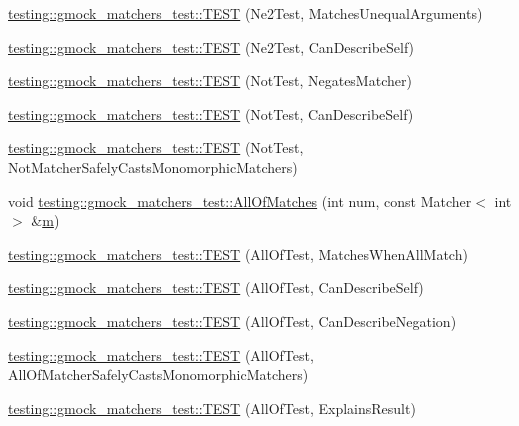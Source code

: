 \begin{DoxyCompactItemize}
\hyperlink{namespacetesting_1_1gmock__matchers__test_a69692057d2825f6fc8a37265667867c7}{testing\+::gmock\+\_\+matchers\+\_\+test\+::\+T\+E\+ST} (Ne2\+Test, Matches\+Unequal\+Arguments)
\item 
\hyperlink{namespacetesting_1_1gmock__matchers__test_acedf2eda13385067ee70bdb7d6073427}{testing\+::gmock\+\_\+matchers\+\_\+test\+::\+T\+E\+ST} (Ne2\+Test, Can\+Describe\+Self)
\item 
\hyperlink{namespacetesting_1_1gmock__matchers__test_ab41b57eeaea5568064b6ed3725316c73}{testing\+::gmock\+\_\+matchers\+\_\+test\+::\+T\+E\+ST} (Not\+Test, Negates\+Matcher)
\item 
\hyperlink{namespacetesting_1_1gmock__matchers__test_a831db2bf90c3950953cdceaefebddd40}{testing\+::gmock\+\_\+matchers\+\_\+test\+::\+T\+E\+ST} (Not\+Test, Can\+Describe\+Self)
\item 
\hyperlink{namespacetesting_1_1gmock__matchers__test_a46849e0c019e331f830ed91137fa417a}{testing\+::gmock\+\_\+matchers\+\_\+test\+::\+T\+E\+ST} (Not\+Test, Not\+Matcher\+Safely\+Casts\+Monomorphic\+Matchers)
\item 
void \hyperlink{namespacetesting_1_1gmock__matchers__test_a51d8731c3824a6acdaa594645dd46779}{testing\+::gmock\+\_\+matchers\+\_\+test\+::\+All\+Of\+Matches} (int num, const Matcher$<$ int $>$ \&\hyperlink{variables__e_8js_aab4247b6acebcba996939b177f483c14}{m})
\item 
\hyperlink{namespacetesting_1_1gmock__matchers__test_a7714d041eb2dd2e233db7f175fedef5a}{testing\+::gmock\+\_\+matchers\+\_\+test\+::\+T\+E\+ST} (All\+Of\+Test, Matches\+When\+All\+Match)
\item 
\hyperlink{namespacetesting_1_1gmock__matchers__test_a31056975d89eea2786997cf18b086bf4}{testing\+::gmock\+\_\+matchers\+\_\+test\+::\+T\+E\+ST} (All\+Of\+Test, Can\+Describe\+Self)
\item 
\hyperlink{namespacetesting_1_1gmock__matchers__test_a86c15b3bc163321c7a56aeb0b1709b87}{testing\+::gmock\+\_\+matchers\+\_\+test\+::\+T\+E\+ST} (All\+Of\+Test, Can\+Describe\+Negation)
\item 
\hyperlink{namespacetesting_1_1gmock__matchers__test_a4196a4000390e2378954d55b4f6d2893}{testing\+::gmock\+\_\+matchers\+\_\+test\+::\+T\+E\+ST} (All\+Of\+Test, All\+Of\+Matcher\+Safely\+Casts\+Monomorphic\+Matchers)
\item 
\hyperlink{namespacetesting_1_1gmock__matchers__test_a2b9f4a791dd4f1fb9f8a1400883a5db4}{testing\+::gmock\+\_\+matchers\+\_\+test\+::\+T\+E\+ST} (All\+Of\+Test, Explains\+Result)
\item 

\end{DoxyCompactItemize}
